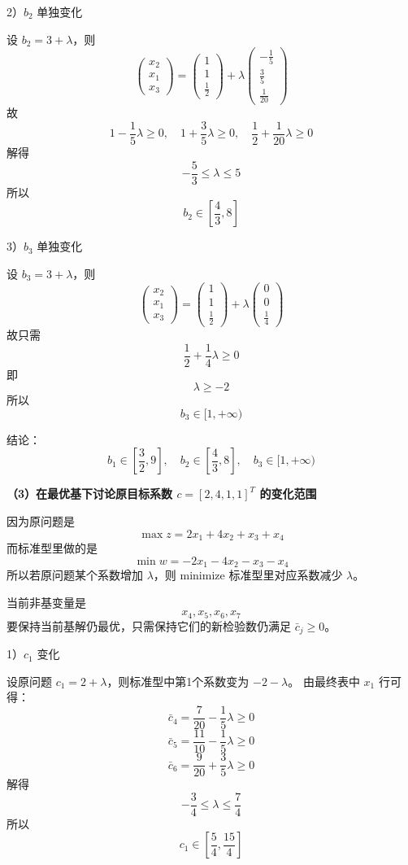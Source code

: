 \documentclass[12pt,a4paper]{article}
\begin{document}
2）$b_2$ 单独变化

设 $b_2=3+\lambda$，则
\[
\begin{pmatrix}x_2\\x_1\\x_3\end{pmatrix}
=
\begin{pmatrix}1\\1\\\frac12\end{pmatrix}
+\lambda
\begin{pmatrix}-\frac15\\\frac35\\\frac1{20}\end{pmatrix}
\]
故
\[
1-\frac15\lambda\ge 0,\quad 1+\frac35\lambda\ge 0,\quad \frac12+\frac1{20}\lambda\ge 0
\]
解得
\[
-\frac53\le \lambda\le 5
\]
所以
\[
b_2\in \left[\frac43,8\right]
\]

3）$b_3$ 单独变化

设 $b_3=3+\lambda$，则
\[
\begin{pmatrix}x_2\\x_1\\x_3\end{pmatrix}
=
\begin{pmatrix}1\\1\\\frac12\end{pmatrix}
+\lambda
\begin{pmatrix}0\\0\\\frac14\end{pmatrix}
\]
故只需
\[
\frac12+\frac14\lambda\ge 0
\]
即
\[
\lambda\ge -2
\]
所以
\[
b_3\in [1,+\infty)
\]

结论：
\[
b_1\in \left[\frac32,9\right],\quad b_2\in \left[\frac43,8\right],\quad b_3\in [1,+\infty)
\]

\textbf{（3）在最优基下讨论原目标系数 $c=[2,4,1,1]^T$ 的变化范围}

因为原问题是
\[
\max z=2x_1+4x_2+x_3+x_4
\]
而标准型里做的是
\[
\min w=-2x_1-4x_2-x_3-x_4
\]
所以若原问题某个系数增加 $\lambda$，则 minimize 标准型里对应系数减少 $\lambda$。

当前非基变量是
\[
x_4,x_5,x_6,x_7
\]
要保持当前基解仍最优，只需保持它们的新检验数仍满足 $\bar c_j\ge 0$。

1）$c_1$ 变化

设原问题 $c_1=2+\lambda$，则标准型中第1个系数变为 $-2-\lambda$。
由最终表中 $x_1$ 行可得：
\[
\bar c_4=\frac7{20}-\frac15\lambda\ge 0
\]
\[
\bar c_5=\frac{11}{10}-\frac15\lambda\ge 0
\]
\[
\bar c_6=\frac9{20}+\frac35\lambda\ge 0
\]
解得
\[
-\frac34\le \lambda\le \frac74
\]
所以
\[
c_1\in \left[\frac54,\frac{15}4\right]
\]
\end{document}
